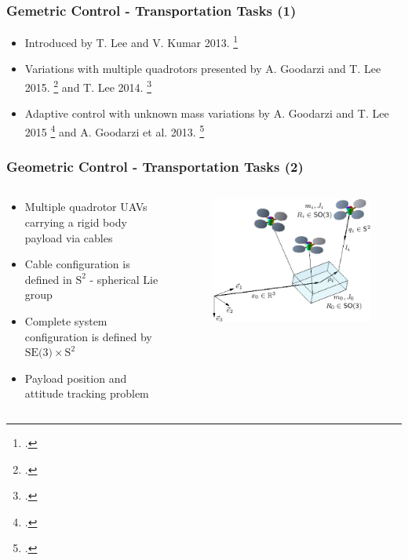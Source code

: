 \begin{frame}
	\frametitle{Gemetric Control - Transportation Tasks (1)}
	
	\begin{itemize}
		\item Introduced by T. Lee and V. Kumar 2013. \footcite{cable-load1}
		\item Variations with multiple quadrotors presented by A. Goodarzi and T. Lee 2015. \footcite{cable-load-multiple} and T. Lee 2014. \footcite{Lee2014GeometricCO}
		\item Adaptive control with unknown mass variations by A. Goodarzi and T. Lee 2015 \footcite{flexible-cable-dynamics} and A. Goodarzi et al. 2013. \footcite{stabilization-flexible-cable}
	\end{itemize}
\end{frame}

\begin{frame}
	\frametitle{Geometric Control - Transportation Tasks (2)}
	
	\begin{columns}
		\begin{column}{0.5\textwidth}\centering
			\begin{itemize}
				\item Multiple quadrotor UAVs carrying a rigid body payload via cables
				\item Cable configuration is defined in $\text{S}^2$ - spherical Lie group
				\item Complete system configuration is defined by $\text{SE(3)} \times \text{S}^2$
				\item Payload position and attitude tracking problem
			\end{itemize}
		\end{column}
		
		\begin{column}{0.5\textwidth}\centering
			\begin{figure}[H]
				\includegraphics[width=\columnwidth]{figures/payload_carrying.png}	
				\centering
			\end{figure}
		\end{column}
	\end{columns}
		
\end{frame}